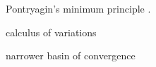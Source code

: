 Pontryagin's minimum principle \textcite{Pontryagin1962}.

calculus of variations

narrower basin of convergence






